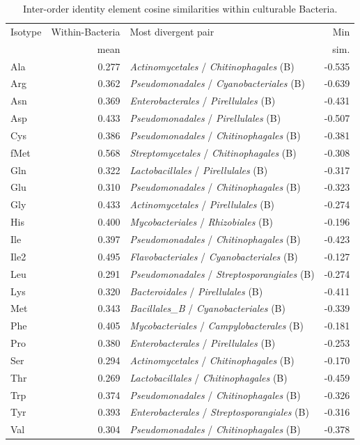 \begin{table}[!ht]
\centering
\small
\caption{Inter-order identity element cosine similarities within culturable Bacteria.}
\label{tab:order_identity_bacteria_culturable}
\begin{tabular}{lrlr}
\toprule
Isotype & \multicolumn{1}{c}{Within-Bacteria} & Most divergent pair & Min \\
 & mean & & sim. \\
\midrule
  Ala & 0.277 & \textit{Actinomycetales} / \textit{Chitinophagales} (B) & -0.535 \\
  Arg & 0.362 & \textit{Pseudomonadales} / \textit{Cyanobacteriales} (B) & -0.639 \\
  Asn & 0.369 & \textit{Enterobacterales} / \textit{Pirellulales} (B) & -0.431 \\
  Asp & 0.433 & \textit{Pseudomonadales} / \textit{Pirellulales} (B) & -0.507 \\
  Cys & 0.386 & \textit{Pseudomonadales} / \textit{Chitinophagales} (B) & -0.381 \\
  fMet & 0.568 & \textit{Streptomycetales} / \textit{Chitinophagales} (B) & -0.308 \\
  Gln & 0.322 & \textit{Lactobacillales} / \textit{Pirellulales} (B) & -0.317 \\
  Glu & 0.310 & \textit{Pseudomonadales} / \textit{Chitinophagales} (B) & -0.323 \\
  Gly & 0.433 & \textit{Actinomycetales} / \textit{Pirellulales} (B) & -0.274 \\
  His & 0.400 & \textit{Mycobacteriales} / \textit{Rhizobiales} (B) & -0.196 \\
  Ile & 0.397 & \textit{Pseudomonadales} / \textit{Chitinophagales} (B) & -0.423 \\
  Ile2 & 0.495 & \textit{Flavobacteriales} / \textit{Cyanobacteriales} (B) & -0.127 \\
  Leu & 0.291 & \textit{Pseudomonadales} / \textit{Streptosporangiales} (B) & -0.274 \\
  Lys & 0.320 & \textit{Bacteroidales} / \textit{Pirellulales} (B) & -0.411 \\
  Met & 0.343 & \textit{Bacillales\_B} / \textit{Cyanobacteriales} (B) & -0.339 \\
  Phe & 0.405 & \textit{Mycobacteriales} / \textit{Campylobacterales} (B) & -0.181 \\
  Pro & 0.380 & \textit{Enterobacterales} / \textit{Pirellulales} (B) & -0.253 \\
  Ser & 0.294 & \textit{Actinomycetales} / \textit{Chitinophagales} (B) & -0.170 \\
  Thr & 0.269 & \textit{Lactobacillales} / \textit{Chitinophagales} (B) & -0.459 \\
  Trp & 0.374 & \textit{Pseudomonadales} / \textit{Chitinophagales} (B) & -0.326 \\
  Tyr & 0.393 & \textit{Enterobacterales} / \textit{Streptosporangiales} (B) & -0.316 \\
  Val & 0.304 & \textit{Pseudomonadales} / \textit{Chitinophagales} (B) & -0.378 \\
\bottomrule
\end{tabular}
\end{table}

